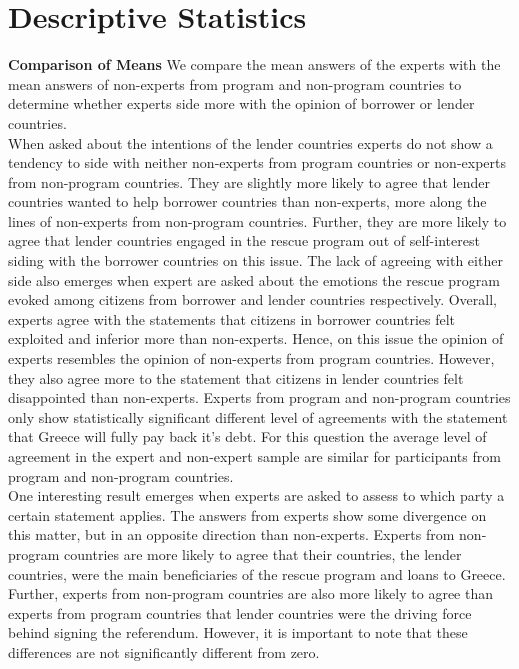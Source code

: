 \section{Descriptive Statistics}

\textbf{Comparison of Means}
We compare the mean answers of the experts with the mean answers of non-experts from program and non-program countries to determine whether experts side more with the opinion of borrower or lender countries.\\
When asked about the intentions of the lender countries experts do not show a tendency to side with neither non-experts from program countries or non-experts from non-program countries. They are slightly more likely to agree that lender countries wanted to help borrower countries than non-experts, more along the lines of non-experts from non-program countries. Further, they are more likely to agree that lender countries engaged in the rescue program out of self-interest siding with the borrower countries on this issue. The lack of agreeing with either side also emerges when expert are asked about the emotions the rescue program evoked among citizens from borrower and lender countries respectively. Overall, experts agree with the statements that citizens in borrower countries felt exploited and inferior more than non-experts. Hence, on this issue the opinion of experts resembles the opinion of non-experts from program countries. However, they also agree more to the statement that citizens in lender countries felt disappointed than non-experts. Experts from program and non-program countries only show statistically significant different level of agreements with the statement that Greece will fully pay back it's debt. For this question the average level of agreement in the expert and non-expert sample are similar for participants from program and non-program countries. \\
One interesting result emerges when experts are asked to assess to which party a certain statement applies. The answers from experts show some divergence on this matter, but in an opposite direction than non-experts. Experts from non-program countries are more likely to agree that their countries, the lender countries, were the main beneficiaries of the rescue program and loans to Greece. Further, experts from non-program countries are also more likely to agree than experts from program countries that lender countries were the driving force behind signing the referendum. However, it is important to note that these differences are not significantly different from zero.  \\

